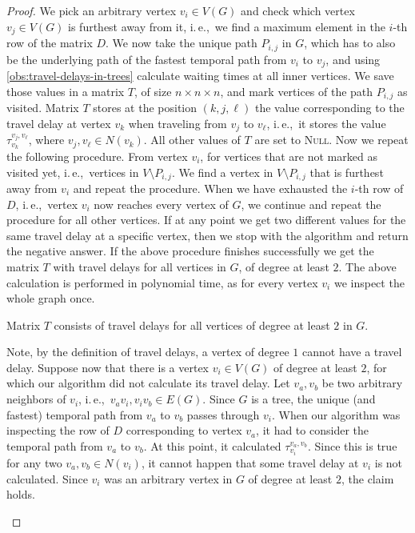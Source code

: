 \documentclass[a4paper,UKenglish,cleveref, autoref, thm-restate]{lipics-v2021}
\newcommand{\ie}{i.\,e.,\ }
\begin{document}
\begin{proof}
    We pick an arbitrary vertex $v_i \in V(G)$ and check which vertex $v_j \in V(G)$ is furthest away from it, \ie we find a maximum element in the $i$-th row of the matrix $D$.
    We now take the unique path $P_{i,j}$ in $G$, 
    which has to also be the underlying path of the fastest temporal path from $v_i$ to $v_j$, and using \cref{obs:travel-delays-in-trees} calculate waiting times at all inner vertices.
    We save those values in a matrix $T$, of size $n \times n \times n$, and mark vertices of the path  $P_{i,j}$ as visited.
    Matrix $T$ stores at the position $(k,j,\ell)$ the value corresponding to the travel delay at vertex $v_k$ when traveling from $v_{j}$ to $v_{\ell}$, 
    \ie it stores the value $\tau_{v_k}^{v_{j}, v_\ell}$, where $v_j,v_\ell \in N(v_k)$. All other values of $T$ are set to \textsc{Null}.
    Now we repeat the following procedure. From vertex $v_i$, for vertices that are not marked as visited yet, \ie vertices in $V \setminus P_{i,j}$.
    We find a vertex in $V \setminus P_{i,j}$ that is furthest away from $v_i$ and repeat the procedure.
    When we have exhausted the $i$-th row of $D$,
    \ie vertex $v_i$ now reaches every vertex of $G$,
    we continue and repeat the procedure for all other vertices.
    If at any point we get two different values for the same travel delay at a specific vertex, then we stop with the algorithm and return the negative answer.
    If the above procedure finishes successfully we get the matrix $T$ with travel delays for all vertices in $G$, of degree at least $2$.
    The above calculation is performed in polynomial time, as for every vertex $v_i$ we inspect the whole graph once.
    \begin{claim}\label{lemma:matrixT-travelDelays-tree}
        Matrix $T$ consists of travel delays for all vertices of degree at least $2$ in $G$.
    \end{claim}
    \begin{claimproof}
        Note, by the definition of travel delays, a vertex of degree $1$ cannot have a travel delay.
        Suppose now that there is a vertex $v_i \in V(G)$ of degree at least $2$, for which our algorithm did not calculate its travel delay.
        Let $v_a, v_b$ be two arbitrary neighbors of $v_i$, \ie $v_a v_i, v_i v_b \in E(G)$.
        Since $G$ is a tree, the unique (and fastest) temporal path from $v_a$ to $v_b$ passes through $v_i$.
        When our algorithm was inspecting the row of $D$ corresponding to vertex $v_a$, it had to consider the temporal path from $v_a$ to $v_b$. 
        At this point, it calculated $\tau_{v_i}^{v_a,v_b}$. 
        Since this is true for any two $v_a, v_b \in N(v_i)$, it cannot happen that some travel delay at $v_i$ is not calculated.
        Since $v_i$ was an arbitrary vertex in $G$ of degree at least $2$, the claim holds.
    \end{claimproof}
    

\end{proof}
\end{document}

